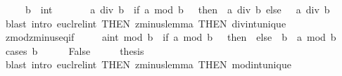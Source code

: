 \begin{isabellebody}
\ \ \ \ \ {\isachardoublequoteopen}b\ {\isasymnoteq}\ {\isacharparenleft}{\kern0pt}{}{\isacharcolon}{\kern0pt}{\isacharcolon}{\kern0pt}int{\isacharparenright}{\kern0pt}\isanewline
\ \ \ \ \ \ {\isasymLongrightarrow}\ {\isacharparenleft}{\kern0pt}{\isacharminus}{\kern0pt}a{\isacharparenright}{\kern0pt}\ div\ b\ {\isacharequal}{\kern0pt}\ {\isacharparenleft}{\kern0pt}if\ a\ mod\ b\ {\isacharequal}{\kern0pt}\ {}\ then\ {\isacharminus}{\kern0pt}\ {\isacharparenleft}{\kern0pt}a\ div\ b{\isacharparenright}{\kern0pt}\ else\ \ {\isacharminus}{\kern0pt}\ {\isacharparenleft}{\kern0pt}a\ div\ b{\isacharparenright}{\kern0pt}\ {\isacharminus}{\kern0pt}\ {}{\isacharparenright}{\kern0pt}{\isachardoublequoteclose}\isanewline
%
\isadelimproof
%
\endisadelimproof
%
\isatagproof
{}\isamarkupfalse%
\ {\isacharparenleft}{\kern0pt}blast\ intro{\isacharcolon}{\kern0pt}\ eucl{\isacharunderscore}{\kern0pt}rel{\isacharunderscore}{\kern0pt}int\ {\isacharbrackleft}{\kern0pt}THEN\ zminus{}{\isacharunderscore}{\kern0pt}lemma{\isacharcomma}{\kern0pt}\ THEN\ div{\isacharunderscore}{\kern0pt}int{\isacharunderscore}{\kern0pt}unique{\isacharbrackright}{\kern0pt}{\isacharparenright}{\kern0pt}%
\endisatagproof
{\isafoldproof}%
%
\isadelimproof
\isanewline
%
\endisadelimproof
\isanewline
{}\isamarkupfalse%
\ zmod{\isacharunderscore}{\kern0pt}zminus{}{\isacharunderscore}{\kern0pt}eq{\isacharunderscore}{\kern0pt}if{\isacharcolon}{\kern0pt}\isanewline
\ \ \ \ \ {\isachardoublequoteopen}{\isacharparenleft}{\kern0pt}{\isacharminus}{\kern0pt}a{\isacharcolon}{\kern0pt}{\isacharcolon}{\kern0pt}int{\isacharparenright}{\kern0pt}\ mod\ b\ {\isacharequal}{\kern0pt}\ {\isacharparenleft}{\kern0pt}if\ a\ mod\ b\ {\isacharequal}{\kern0pt}\ {}\ then\ {}\ else\ \ b\ {\isacharminus}{\kern0pt}\ {\isacharparenleft}{\kern0pt}a\ mod\ b{\isacharparenright}{\kern0pt}{\isacharparenright}{\kern0pt}{\isachardoublequoteclose}\isanewline
%
\isadelimproof
%
\endisadelimproof
%
\isatagproof
{}\isamarkupfalse%
\ {\isacharparenleft}{\kern0pt}cases\ {\isachardoublequoteopen}b\ {\isacharequal}{\kern0pt}\ {}{\isachardoublequoteclose}{\isacharparenright}{\kern0pt}\isanewline
\ \ \isamarkupfalse%
\ False\isanewline
\ \ \isamarkupfalse%
\ \isamarkupfalse%
\ {\isacharquery}{\kern0pt}thesis\isanewline
\ \ \ \ \isamarkupfalse%
\ {\isacharparenleft}{\kern0pt}blast\ intro{\isacharcolon}{\kern0pt}\ eucl{\isacharunderscore}{\kern0pt}rel{\isacharunderscore}{\kern0pt}int\ {\isacharbrackleft}{\kern0pt}THEN\ zminus{}{\isacharunderscore}{\kern0pt}lemma{\isacharcomma}{\kern0pt}\ THEN\ mod{\isacharunderscore}{\kern0pt}int{\isacharunderscore}{\kern0pt}unique{\isacharbrackright}{\kern0pt}{\isacharparenright}{\kern0pt}\isanewline

\end{isabellebody}
